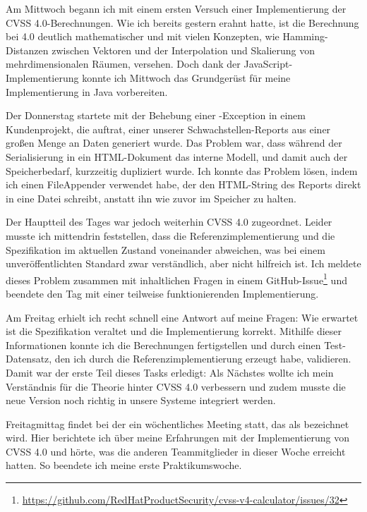 
Am Mittwoch begann ich mit einem ersten Versuch einer Implementierung der CVSS 4.0-Berechnungen.
Wie ich bereits gestern erahnt hatte, ist die Berechnung bei 4.0 deutlich mathematischer und mit vielen Konzepten, wie Hamming-Distanzen zwischen Vektoren und der Interpolation und Skalierung von mehrdimensionalen Räumen, versehen.
Doch dank der JavaScript-Implementierung konnte ich Mittwoch das Grundgerüst für meine Implementierung in Java vorbereiten.


Der Donnerstag startete mit der Behebung einer -Exception in einem Kundenprojekt, die auftrat, einer unserer Schwachstellen-Reports aus einer großen Menge an Daten generiert wurde.
Das Problem war, dass während der Serialisierung in ein HTML-Dokument das interne Modell, und damit auch der Speicherbedarf, kurzzeitig dupliziert wurde.
Ich konnte das Problem lösen, indem ich einen FileAppender verwendet habe, der den HTML-String des Reports direkt in eine Datei schreibt, anstatt ihn wie zuvor im Speicher zu halten.

Der Hauptteil des Tages war jedoch weiterhin CVSS 4.0 zugeordnet.
Leider musste ich mittendrin feststellen, dass die Referenzimplementierung und die Spezifikation im aktuellen Zustand voneinander abweichen, was bei einem unveröffentlichten Standard zwar verständlich, aber nicht hilfreich ist.
Ich meldete dieses Problem zusammen mit inhaltlichen Fragen in einem GitHub-Issue\footnote{\url{https://github.com/RedHatProductSecurity/cvss-v4-calculator/issues/32}} und beendete den Tag mit einer teilweise funktionierenden Implementierung.


Am Freitag erhielt ich recht schnell eine Antwort auf meine Fragen:
Wie erwartet ist die Spezifikation veraltet und die Implementierung korrekt.
Mithilfe dieser Informationen konnte ich die Berechnungen fertigstellen und durch einen Test-Datensatz, den ich durch die Referenzimplementierung erzeugt habe, validieren.
Damit war der erste Teil dieses Tasks erledigt:
Als Nächstes wollte ich mein Verständnis für die Theorie hinter CVSS 4.0 verbessern und zudem musste die neue Version noch richtig in unsere Systeme integriert werden.

Freitagmittag findet bei der {\metaeffekt} ein wöchentliches Meeting statt, das als  bezeichnet wird.
Hier berichtete ich über meine Erfahrungen mit der Implementierung von CVSS 4.0 und hörte, was die anderen Teammitglieder in dieser Woche erreicht hatten.
So beendete ich meine erste Praktikumswoche.
